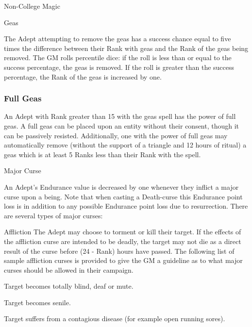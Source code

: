 \begin{Chapter}{Non-College Magic}
\begin{ritual}{Geas}
\begin{effects}
The Adept attempting to remove the geas has a success chance equal to
five times the difference between their Rank with geas and the Rank of
the geas being removed. The GM rolls percentile dice: if the roll is
less than or equal to the success percentage, the geas is removed.  If
the roll is greater than the success percentage, the Rank of the geas
is increased by one.

\subsubsection{Full Geas}

An Adept with Rank greater than 15 with the geas spell has the power
of full geas.  A full geas can be placed upon an entity without their
consent, though it can be passively resisted.  Additionally, one with
the power of full geas may automatically remove (without the support
of a triangle and 12 hours of ritual) a geas which is at least 5 Ranks
less than their Rank with the spell.
\end{effects}
\end{ritual}

\begin{ritual}{Major Curse}

\begin{effects}
An Adept’s Endurance value is decreased by one whenever they inflict a
major curse upon a being.  Note that when casting a Death-curse this
Endurance point loss is in addition to any possible Endurance point
loss due to resurrection. There are several types of major curses:

Affliction The Adept may choose to torment or kill their target. If
the effects of the affliction curse are intended to be deadly, the
target may not die as a direct result of the curse before (24 - Rank)
hours have passed. The following list of sample affliction curses is
provided to give the GM a guideline as to what major curses should be
allowed in their campaign.
\begin{Enumerate}
\item Target becomes totally blind, deaf or mute. 

\item Target becomes senile. 

\item Target suffers from a contagious disease (for example open
  running sores).


\end{Enumerate}
\end{effects}
\end{ritual}
\end{Chapter}
